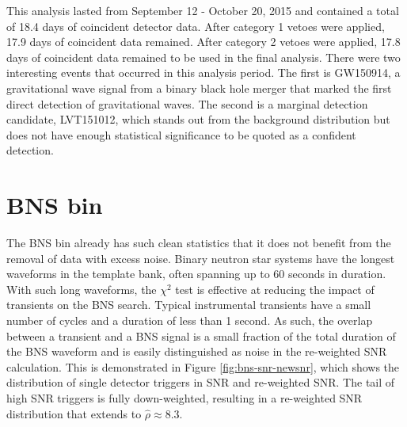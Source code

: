 This analysis lasted from September 12 - October 20, 2015 and contained a total
of 18.4 days of coincident detector data. After category 1 vetoes were applied, 17.9 days
of coincident data remained. After category 2 vetoes were applied, 17.8 days of coincident
data remained to be used in the final analysis. There were two interesting events that
occurred in this analysis period. The first is GW150914, a gravitational wave signal
from a binary black hole merger that marked the first direct detection of
gravitational waves\cite{GW150914-DETECTION}. The second is a marginal
detection candidate, LVT151012, which stands out
from the background distribution but does not have enough statistical
significance to be quoted as a confident detection.

\section{BNS bin}

The BNS bin already has such clean statistics that it does not benefit from the
removal of data with excess noise.
Binary neutron star systems have the longest waveforms in the template bank, often spanning up
to 60 seconds in duration. With such long waveforms, the $\chi^{2}$ test is effective at
reducing the impact of transients on the BNS search. Typical instrumental transients have a small
number of cycles and a duration of less than 1 second. As such, the overlap between a transient
and a BNS signal is a small fraction of the total duration of the BNS waveform and is easily
distinguished as noise in the re-weighted SNR calculation. This is demonstrated in Figure
\ref{fig:bns-snr-newsnr}, which shows the distribution of single detector triggers in SNR
and re-weighted SNR. The tail of high SNR triggers is fully down-weighted, resulting in a
re-weighted SNR distribution that extends to $\hat{\rho} \approx 8.3$.


